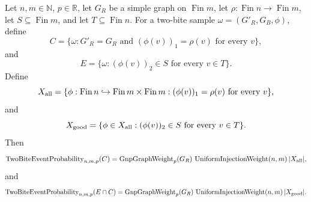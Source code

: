 \begin{helper}
\label{helper:OppositeProjectionRowInjectionLawBridge}
Let \(n,m\in\mathbb N\), \(p\in\mathbb R\), let \(G_R\) be a simple graph on
\(\operatorname{Fin}m\), let \(\rho:\operatorname{Fin}n\to\operatorname{Fin}m\),
let \(S\subseteq\operatorname{Fin}m\), and let
\(T\subseteq\operatorname{Fin}n\).  For a two-bite sample
\(\omega=(G'_R,G_B,\phi)\), define
\[
C=\{\omega:G'_R=G_R\text{ and }(\phi(v))_1=\rho(v)\text{ for every }v\},
\]
and
\[
E=\{\omega:(\phi(v))_2\in S\text{ for every }v\in T\}.
\]
Define
\[
X_{\rm all}
=\{\phi:\operatorname{Fin}n\hookrightarrow
\operatorname{Fin}m\times\operatorname{Fin}m:
(\phi(v))_1=\rho(v)\text{ for every }v\},
\]
and
\[
X_{\rm good}
=\{\phi\in X_{\rm all}:(\phi(v))_2\in S\text{ for every }v\in T\}.
\]
Then
\[
\operatorname{TwoBiteEventProbability}_{n,m,p}(C)
=\operatorname{GnpGraphWeight}_p(G_R)\,
  \operatorname{UniformInjectionWeight}(n,m)\,|X_{\rm all}|,
\]
and
\[
\operatorname{TwoBiteEventProbability}_{n,m,p}(E\cap C)
=\operatorname{GnpGraphWeight}_p(G_R)\,
  \operatorname{UniformInjectionWeight}(n,m)\,|X_{\rm good}|.
\]
\end{helper}
